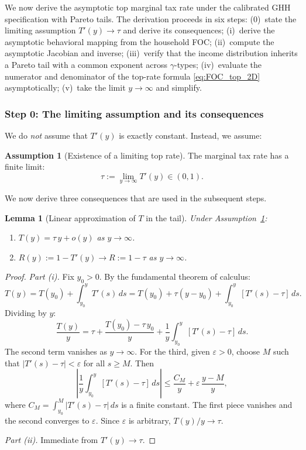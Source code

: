 \documentclass[12pt,a4paper]{article}
\theoremstyle{definition}
\newtheorem{assumption}{Assumption}[section]
\theoremstyle{plain}
\newtheorem{lemma}{Lemma}[section]
\theoremstyle{remark}
\begin{document}
We now derive the asymptotic top marginal tax rate under the calibrated GHH specification with Pareto tails.  The derivation proceeds in six steps: (0)~state the limiting assumption $T'(y) \to \tau$ and derive its consequences; (i)~derive the asymptotic behavioral mapping from the household FOC; (ii)~compute the asymptotic Jacobian and inverse; (iii)~verify that the income distribution inherits a Pareto tail with a common exponent across $\gamma$-types; (iv)~evaluate the numerator and denominator of the top-rate formula \eqref{eq:FOC_top_2D} asymptotically; (v)~take the limit $y \to \infty$ and simplify.

\subsubsection{Step 0: The limiting assumption and its consequences}

We do \emph{not} assume that $T'(y)$ is exactly constant.  Instead, we assume:

\begin{assumption}[Existence of a limiting top rate]
\label{as:limiting_tau}
The marginal tax rate has a finite limit:
\[
  \tau := \lim_{y \to \infty} T'(y) \in (0,1).
\]
\end{assumption}

We now derive three consequences that are used in the subsequent steps.

\begin{lemma}[Linear approximation of $T$ in the tail]
\label{lem:T_linear_approx}
Under Assumption~\ref{as:limiting_tau}:
\begin{enumerate}[label=(\roman*)]
  \item $T(y) = \tau\,y + o(y)$ as $y \to \infty$.
  \item $R(y) := 1 - T'(y) \to R := 1-\tau$ as $y \to \infty$.
\end{enumerate}
\end{lemma}

\begin{proof}
\emph{Part (i).}  Fix $y_0 > 0$.  By the fundamental theorem of calculus:
\[
  T(y) = T(y_0) + \int_{y_0}^{y} T'(s)\,ds = T(y_0) + \tau(y - y_0) + \int_{y_0}^{y}[T'(s) - \tau]\,ds.
\]
Dividing by $y$:
\[
  \frac{T(y)}{y} = \tau + \frac{T(y_0) - \tau\,y_0}{y} + \frac{1}{y}\int_{y_0}^{y}[T'(s) - \tau]\,ds.
\]
The second term vanishes as $y \to \infty$.  For the third, given $\varepsilon > 0$, choose $M$ such that $|T'(s) - \tau| < \varepsilon$ for all $s \geq M$.  Then
\[
  \left|\frac{1}{y}\int_{y_0}^{y}[T'(s) - \tau]\,ds\right| \leq \frac{C_M}{y} + \varepsilon\,\frac{y - M}{y},
\]
where $C_M = \int_{y_0}^{M}|T'(s)-\tau|\,ds$ is a finite constant.  The first piece vanishes and the second converges to $\varepsilon$.  Since $\varepsilon$ is arbitrary, $T(y)/y \to \tau$.

\emph{Part (ii).}  Immediate from $T'(y) \to \tau$.
\end{proof}
\end{document}
